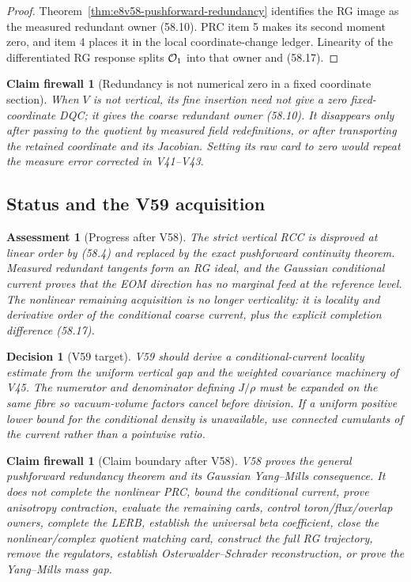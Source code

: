 \documentclass[11pt,oneside]{book}
\newtheorem{assessment}[theorem]{Assessment}
\newtheorem{firewall}[theorem]{Claim firewall}
\newtheorem{decision}[theorem]{Decision}
\theoremstyle{definition}
\theoremstyle{remark}
\begin{document}
\begin{proof}
Theorem~\ref{thm:e8v58-pushforward-redundancy} identifies the RG
image as the measured redundant owner (58.10).  PRC item 5 makes
its second moment zero, and item 4 places it in the local
coordinate-change ledger.  Linearity of the differentiated RG
response splits \({\cal O}_1\) into that owner and (58.17).
\end{proof}

\begin{firewall}[Redundancy is not numerical zero in a fixed
coordinate section]
\label{fire:e8v58-redundancy-section}
When \(V\) is not vertical, its fine insertion need not give a
zero fixed-coordinate DQC; it gives the coarse redundant owner
(58.10).  It disappears only after passing to the quotient by
measured field redefinitions, or after transporting the retained
coordinate and its Jacobian.  Setting its raw card to zero would
repeat the measure error corrected in V41--V43.
\end{firewall}

\subsection{Status and the V59 acquisition}

\begin{assessment}[Progress after V58]
\label{ass:e8v58-status}
The strict vertical RCC is disproved at linear order by (58.4) and
replaced by the exact pushforward continuity theorem.  Measured
redundant tangents form an RG ideal, and the Gaussian conditional
current proves that the EOM direction has no marginal feed at the
reference level.  The nonlinear remaining acquisition is no longer
verticality: it is locality and derivative order of the conditional
coarse current, plus the explicit completion difference (58.17).
\end{assessment}

\begin{decision}[V59 target]
\label{dec:e8v58-next}
V59 should derive a conditional-current locality estimate from the
uniform vertical gap and the weighted covariance machinery of V45.
The numerator and denominator defining \(J/\rho\) must be expanded
on the same fibre so vacuum-volume factors cancel before division.
If a uniform positive lower bound for the conditional density is
unavailable, use connected cumulants of the current rather than a
pointwise ratio.
\end{decision}

\begin{firewall}[Claim boundary after V58]
\label{fire:e8v58-claim}
V58 proves the general pushforward redundancy theorem and its
Gaussian Yang--Mills consequence.  It does not complete the
nonlinear PRC, bound the conditional current, prove anisotropy
contraction, evaluate the remaining cards, control
toron/flux/overlap owners, complete the LERB, establish the
universal beta coefficient, close the nonlinear/complex quotient
matching card, construct the full RG trajectory, remove the
regulators, establish Osterwalder--Schrader reconstruction, or
prove the Yang--Mills mass gap.
\end{firewall}
\end{document}
